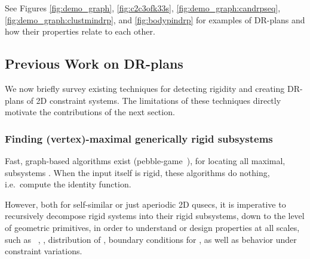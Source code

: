 See Figures \ref{fig:demo_graph}, \ref{fig:c2c3ofk33s}, \ref{fig:demo_graph:candrpseq}, \ref{fig:demo_graph:clustmindrp}, and \ref{fig:bodypindrp} for examples of DR-plans and how their properties relate to each other.


\subsection{Previous Work on DR-plans}
\label{sec:prev}
We now briefly survey existing techniques for detecting rigidity and creating DR-plans of 2D constraint systems. The limitations of these techniques directly motivate the contributions of the next  section.

\subsubsection{Finding (vertex)-maximal generically rigid subsystems}
Fast, graph-based algorithms exist (pebble-game~\cite{Jacobs:1997:PG,hoffmann1997solvablesubsets,jermann2006decomposition,Lee:2007:PGA}), for locating all maximal,  subsystems \seedefs. When the input itself is rigid, these algorithms do nothing, i.e.\ compute the identity function.

However, both for self-similar or just aperiodic 2D qusecs, it is imperative to recursively decompose rigid systems into their rigid subsystems, down to the level of geometric primitives, in order to understand or design properties at all scales, such as \seedefs\ , , distribution of , boundary conditions for , as well as behavior under constraint variations.

